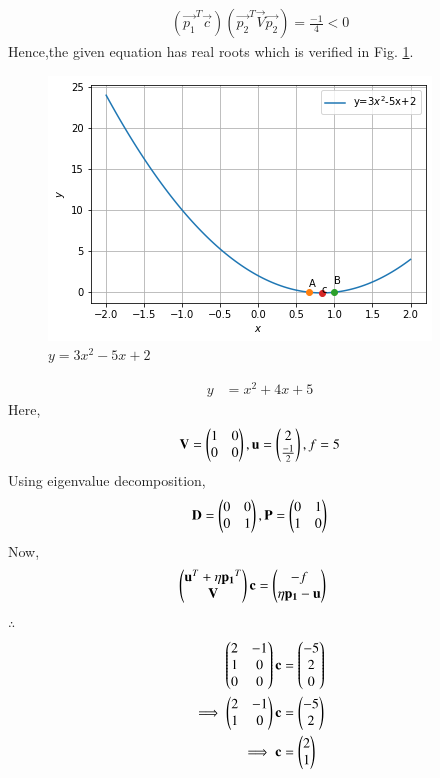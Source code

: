     \begin{align}
    (\vec{p_1}^T\vec{c})(\vec{p_2}^T\vec{V}\vec{p_2}) = \frac{-1}{4}<0
    \end{align}
    Hence,the given equation has real roots which is verified in Fig.  \ref{quad/2/23/ex3}.	
        \begin{figure}[!ht]
            \centering
            \includegraphics[width=\columnwidth]{solutions/su2021/2/23/figure5(1).png}
            \caption{$y=3x^2-5x+2$}
            \label{quad/2/23/ex3}	
            \end{figure}
        
 \item
    \begin{align}
        y &= x^2+4x+5
    \end{align}
    Here,
    \begin{align}
        \mathbf{V} = \begin{pmatrix}1 & 0 \\ 0 & 0\end{pmatrix},\mathbf{u}=\begin{pmatrix}2 \\ \frac{-1}{2}\end{pmatrix},f=5
    \end{align}
    Using eigenvalue decomposition,
    \begin{align}
        \mathbf{D} = \begin{pmatrix}0 & 0\\0 & 1\end{pmatrix} ,\mathbf{P}=\begin{pmatrix}0 & 1\\1 & 0\end{pmatrix}
    \end{align}
    Now,
\begin{align}
    \begin{pmatrix}\mathbf{u}^T + \eta\mathbf{p_1}^T \\ \mathbf{V}\end{pmatrix}\mathbf{c} &= \begin{pmatrix}-f \\ \eta\mathbf{p_1}-\mathbf{u}\end{pmatrix} 
\end{align}
    $\therefore$
    \begin{align}
        \begin{pmatrix}2 & -1 \\ 1 & 0 \\ 0 & 0\end{pmatrix}\mathbf{c} &= \begin{pmatrix}-5 \\ 2 \\ 0\end{pmatrix} \\
        \implies  \begin{pmatrix}2 & -1 \\ 1 & 0\end{pmatrix}\mathbf{c} &= \begin{pmatrix}-5 \\ 2\end{pmatrix}
        \\
        \implies \mathbf{c} &= \begin{pmatrix}2\\1\end{pmatrix}
    \end{align}
    
